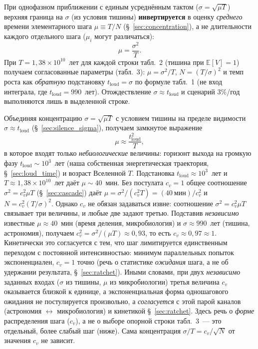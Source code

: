 \documentclass[12pt,a4paper]{article}
\begin{document}
При однофазном приближении с единым усреднённым тактом ($\sigma = \sqrt{\mu T}$) верхняя граница на $\sigma$ (из условия тишины) \textbf{инвертируется} в оценку \emph{среднего} времени элементарного шага $\mu \equiv T/N$ (\S~\ref{sec:concentration}), а не длительности каждого отдельного шага ($\mu_i$ могут различаться):
\begin{equation}
\boxed{\mu = \frac{\sigma^2}{T}.}
\end{equation}
При $T = 1{,}38 \times 10^{10}$~лет для каждой строки табл.~2 (тишина при $\mathbb{E}[V]=1$) получаем согласованные параметры (табл.~3): $\mu=\sigma^2/T$, $N=(T/\sigma)^2$ и темп роста как \emph{обратную} подстановку $t_{\mathrm{loud}}=\sigma$ по формуле табл.~1 (не вход интеграла, где $t_{\mathrm{loud}}=990$~лет). Отождествление $\sigma \approx t_{\mathrm{loud}}$ и сценарий $3\%$/год выполняются лишь в выделенной строке.

Объединяя концентрацию $\sigma = \sqrt{\mu T}$ с условием тишины на пределе видимости $\sigma \approx t_{\mathrm{loud}}$ (\S~\ref{sec:silence_sigma}), получаем замкнутое выражение
\begin{equation}
\mu \approx \frac{t_{\mathrm{loud}}^{2}}{T},
\end{equation}
в которое входят только \emph{небиологические} величины: горизонт выхода на громкую фазу $t_{\mathrm{loud}} \sim 10^3$~лет (наша собственная энергетическая траектория, \S~\ref{sec:loud_time}) и возраст Вселенной $T$. Подстановка $t_{\mathrm{loud}} \approx 10^3$~лет и $T \approx 1{,}38 \times 10^{10}$~лет даёт $\mu \sim 40$~мин. Без постулата $c_v = 1$ общее соотношение $\sigma^2 = c_v^2\mu T$ (\S~\ref{sec:cascade}) даёт $\mu = \sigma^2/(c_v^2 T) = (40~\text{мин})/c_v^2$ и $N = c_v^2 (T/\sigma)^2$. Однако $c_v$ не обязан задаваться извне: соотношение $\sigma^2 = c_v^2\mu T$ связывает три величины, и любые две задают третью. Подставив \emph{независимо} известные $\mu \approx 40$~мин (время деления, микробиология) и $\sigma \approx 990$~лет (тишина, астрономия), получаем $c_v^2 = \sigma^2/(\mu T) \approx 0{,}93$, то есть $c_v \approx 0{,}97 \approx 1$. Кинетически это согласуется с тем, что шаг лимитируется единственным переходом с постоянной интенсивностью: минимум параллельных попыток экспоненциален, $c_v=1$ точно (речь о статистике \emph{ожидания} шага, а не об удержании результата, \S~\ref{sec:ratchet}). Иными словами, при двух \emph{независимо} заданных входах ($\sigma$ из тишины, $\mu$ из микробиологии) третья величина $c_v$ оказывается близкой к единице, а экспоненциальная форма одношагового ожидания не постулируется произвольно, а \emph{согласуется} с этой парой каналов (астрономия $\leftrightarrow$ микробиология) и кинетикой §~\ref{sec:ratchet}. Здесь речь о \emph{форме} распределения шага ($c_v$), а не о выборе опорной строки табл.~3~--- это отдельный, более слабый шаг (ниже). Сама концентрация $\sigma/T = c_v/\sqrt{N}$ от значения $c_v$ не зависит.
\end{document}
